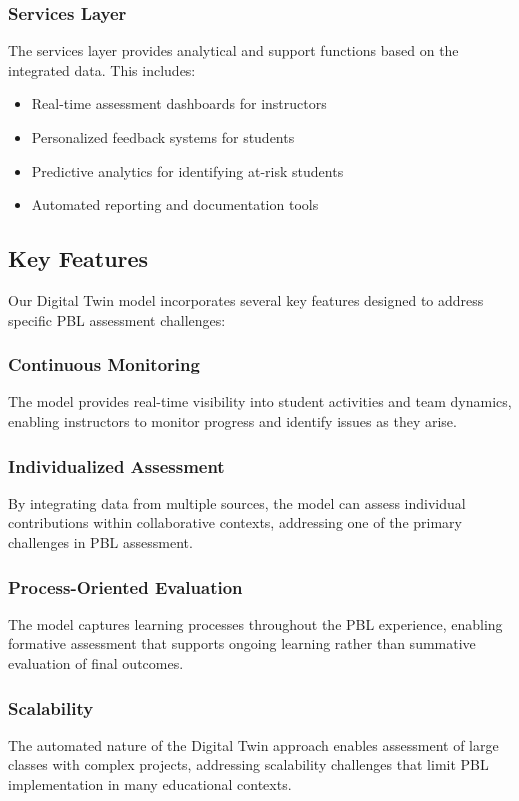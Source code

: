 \documentclass[review]{elsarticle}
\begin{document}
\subsubsection{Services Layer}
The services layer provides analytical and support functions based on the integrated data. This includes:
\begin{itemize}
    \item Real-time assessment dashboards for instructors
    \item Personalized feedback systems for students
    \item Predictive analytics for identifying at-risk students
    \item Automated reporting and documentation tools
\end{itemize}

\subsection{Key Features}
\label{sec:features}

Our Digital Twin model incorporates several key features designed to address specific PBL assessment challenges:

\subsubsection{Continuous Monitoring}
The model provides real-time visibility into student activities and team dynamics, enabling instructors to monitor progress and identify issues as they arise.

\subsubsection{Individualized Assessment}
By integrating data from multiple sources, the model can assess individual contributions within collaborative contexts, addressing one of the primary challenges in PBL assessment.

\subsubsection{Process-Oriented Evaluation}
The model captures learning processes throughout the PBL experience, enabling formative assessment that supports ongoing learning rather than summative evaluation of final outcomes.

\subsubsection{Scalability}
The automated nature of the Digital Twin approach enables assessment of large classes with complex projects, addressing scalability challenges that limit PBL implementation in many educational contexts.
\end{document}
